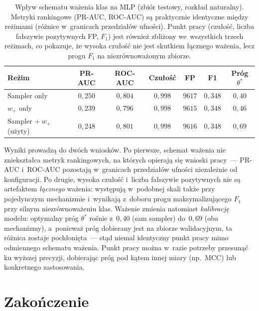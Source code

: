 \documentclass{SGGW-thesis}
\begin{document}
\begin{table}[htbp]
\centering
\small
\caption{Wpływ schematu ważenia klas na MLP (zbiór testowy, rozkład naturalny). Metryki
rankingowe (PR-AUC, ROC-AUC) są praktycznie identyczne między reżimami (różnice w~granicach
przedziałów ufności). Punkt pracy (czułość, liczba fałszywie pozytywnych FP, $F_1$) jest również
zbliżony we~wszystkich trzech reżimach, co pokazuje, że wysoka czułość nie jest skutkiem łącznego
ważenia, lecz progu $F_1$ na niezrównoważonym zbiorze.}
\label{tab:weighting}
\begin{tabular}{lcccccc}
\toprule
\textbf{Reżim} & \textbf{PR-AUC} & \textbf{ROC-AUC} & \textbf{Czułość} & \textbf{FP} & \textbf{F1} & \textbf{Próg $\theta^*$} \\
\midrule
Sampler only      & $0{,}250$ & $0{,}804$ & $0{,}998$ & $9617$ & $0{,}348$ & $0{,}40$ \\
$w_+$ only         & $0{,}239$ & $0{,}796$ & $0{,}998$ & $9615$ & $0{,}348$ & $0{,}46$ \\
Sampler $+\ w_+$ (użyty) & $0{,}248$ & $0{,}801$ & $0{,}998$ & $9616$ & $0{,}348$ & $0{,}69$ \\
\bottomrule
\end{tabular}
\end{table}

Wyniki prowadzą do dwóch wniosków. Po pierwsze, schemat ważenia nie zniekształca metryk
rankingowych, na których opierają się wnioski pracy~--- PR-AUC i~ROC-AUC pozostają w~granicach
przedziałów ufności niezależnie od konfiguracji. Po drugie, wysoka czułość i~liczba fałszywie
pozytywnych nie są artefaktem \emph{łącznego} ważenia: występują w~podobnej skali także przy
pojedynczym mechanizmie i~wynikają z~doboru progu maksymalizującego $F_1$ przy silnym
niezrównoważeniu klas. Ważenie zmienia natomiast \emph{kalibrację} modelu: optymalny próg
$\theta^*$ rośnie z~$0{,}40$ (sam sampler) do~$0{,}69$ (oba mechanizmy), a~ponieważ próg dobierany
jest na zbiorze walidacyjnym, ta różnica zostaje pochłonięta~--- stąd niemal identyczny punkt
pracy mimo odmiennego schematu ważenia. Punkt pracy można w~razie potrzeby przesunąć ku wyższej
precyzji, dobierając próg pod kątem innej miary (np.\ MCC) lub konkretnego zastosowania.

\chapter{Zakończenie}
\label{chap:zakonczenie}
\end{document}
